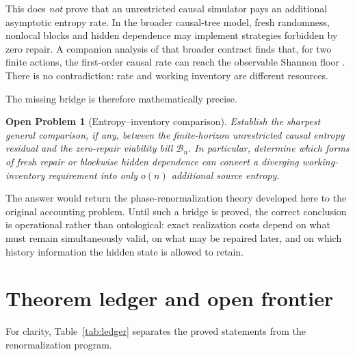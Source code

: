 \documentclass[11pt,a4paper]{article}
\newtheorem{problem}[theorem]{Open Problem}
\theoremstyle{definition}
\theoremstyle{remark}
\newcommand{\cB}{\mathcal B}
\begin{document}
This does \emph{not} prove that an unrestricted causal simulator pays an
additional asymptotic entropy rate.  In the broader causal-tree model, fresh
randomness, nonlocal blocks and hidden dependence may implement strategies
forbidden by zero repair.  A companion analysis of that broader contract finds
that, for two finite actions, the first-order causal rate can reach the
observable Shannon floor \cite{MikulikCausal}.  There is no contradiction:
rate and working inventory are different resources.

The missing bridge is therefore mathematically precise.

\begin{problem}[Entropy--inventory comparison]
\label{prob:entropyinventory}
Establish the sharpest general comparison, if any, between the finite-horizon
unrestricted causal entropy residual and the zero-repair viability bill
$\cB_n$.  In particular, determine which forms of fresh repair or blockwise
hidden dependence can convert a diverging working-inventory requirement into
only $o(n)$ additional source entropy.
\end{problem}

The answer would return the phase-renormalization theory developed here to the
original accounting problem.  Until such a bridge is proved, the correct
conclusion is operational rather than ontological: exact realization costs
depend on what must remain simultaneously valid, on what may be repaired
later, and on which history information the hidden state is allowed to retain.

\section{Theorem ledger and open frontier}
\label{sec:ledger}

For clarity, Table~\ref{tab:ledger} separates the proved statements from the
renormalization program.
\end{document}
